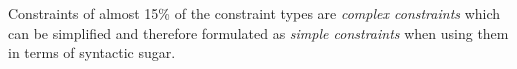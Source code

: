 \documentclass[a4paper,fontsize=11pt]{scrartcl}
\newcommand{\ms}[1]{\texttt{#1}}
\newenvironment{DL}{
  \vspace{0cm}
	\begin{center}
  \begin{tabular}{r l}

}{
  \end{tabular}
	\end{center}
}
\begin{document}
Constraints of almost 15\% of the constraint types are \emph{complex constraints}
which can be simplified and therefore formulated as \emph{simple constraints} when using them in terms of syntactic sugar.
%
%
%
\end{document}
